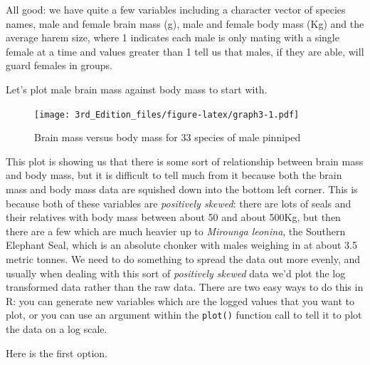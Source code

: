 \documentclass[
]{book}
\newenvironment{Shaded}{\begin{snugshade}}{\end{snugshade}}
\newcommand{\CommentTok}[1]{\textcolor[rgb]{0.56,0.35,0.01}{\textit{#1}}}
\newcommand{\KeywordTok}[1]{\textcolor[rgb]{0.13,0.29,0.53}{\textbf{#1}}}
\newcommand{\NormalTok}[1]{#1}
\newcommand{\OperatorTok}[1]{\textcolor[rgb]{0.81,0.36,0.00}{\textbf{#1}}}
\newcommand{\StringTok}[1]{\textcolor[rgb]{0.31,0.60,0.02}{#1}}
\begin{document}
All good: we have quite a few variables including a character vector of species names, male and female brain mass (g), male and female body mass (Kg) and the average harem size, where 1 indicates each male is only mating with a single female at a time and values greater than 1 tell us that males, if they are able, will guard females in groups.

Let's plot male brain mass against body mass to start with.

\begin{Shaded}
\end{Shaded}

\begin{figure}
\centering
\texttt{[image: 3rd\_Edition\_files/figure-latex/graph3-1.pdf]}
\caption{\label{fig:graph3}Brain mass versus body mass for 33 species of male pinniped}
\end{figure}

This plot is showing us that there is some sort of relationship between brain mass and body mass, but it is difficult to tell much from it because both the brain mass and body mass data are squished down into the bottom left corner. This is because both of these variables are \emph{positively skewed}: there are lots of seals and their relatives with body mass between about 50 and about 500Kg, but then there are a few which are much heavier up to \emph{Mirounga leonina}, the Southern Elephant Seal, which is an absolute chonker with males weighing in at about 3.5 metric tonnes. We need to do something to spread the data out more evenly, and usually when dealing with this sort of \emph{positively skewed} data we'd plot the log transformed data rather than the raw data. There are two easy ways to do this in R: you can generate new variables which are the logged values that you want to plot, or you can use an argument within the \texttt{plot()} function call to tell it to plot the data on a log scale.

Here is the first option.

\begin{Shaded}
\end{Shaded}
\end{document}
